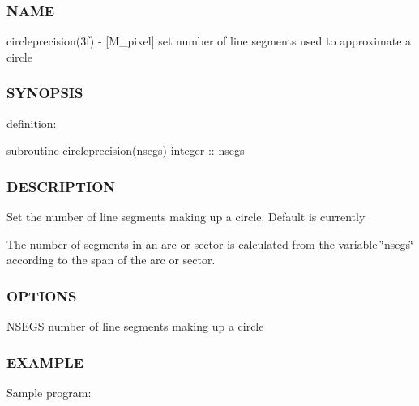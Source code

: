 \subsubsection*{N\+A\+ME}

circleprecision(3f) -\/ \mbox{[}M\+\_\+pixel\mbox{]} set number of line segments used to approximate a circle 

\subsubsection*{S\+Y\+N\+O\+P\+S\+IS}

definition\+:

subroutine circleprecision(nsegs) integer \+:\+: nsegs

\subsubsection*{D\+E\+S\+C\+R\+I\+P\+T\+I\+ON}

Set the number of line segments making up a circle. Default is currently
\begin{DoxyEnumerate}
\item The number of segments in an arc or sector is calculated from the variable \char`\"{}nsegs\char`\"{} according to the span of the arc or sector.
\end{DoxyEnumerate}

\subsubsection*{O\+P\+T\+I\+O\+NS}

N\+S\+E\+GS number of line segments making up a circle

\subsubsection*{E\+X\+A\+M\+P\+LE}

Sample program\+:

